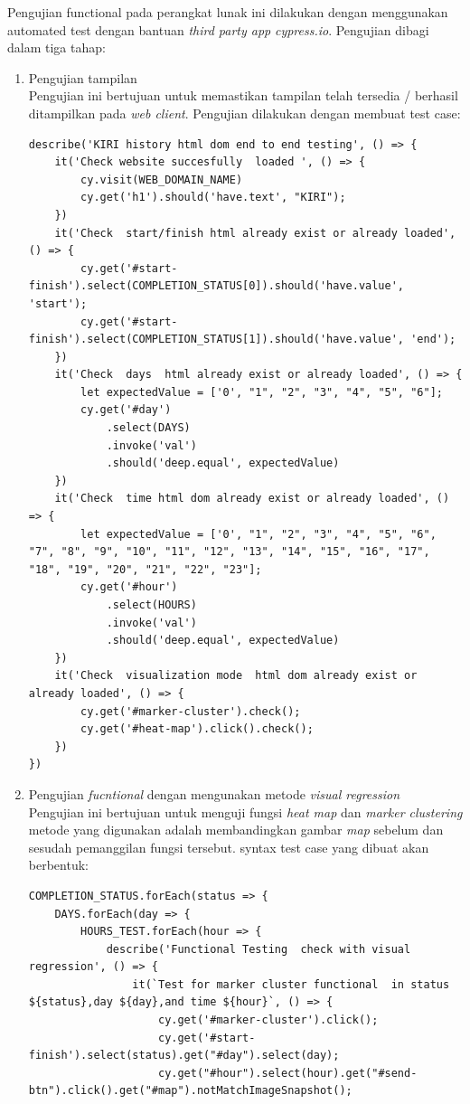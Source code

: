 Pengujian functional pada perangkat lunak ini dilakukan dengan menggunakan automated test dengan bantuan \textit{third party app} \textit{cypress.io}. Pengujian dibagi dalam tiga tahap:

\begin{enumerate}
    \item Pengujian tampilan\\
    Pengujian ini bertujuan untuk memastikan tampilan telah tersedia / berhasil ditampilkan pada \textit{web client}. Pengujian dilakukan dengan membuat test case:\\
    \begin{lstlisting}[label=ui_test_case , caption=UI Test Case]
    describe('KIRI history html dom end to end testing', () => {
    it('Check website succesfully  loaded ', () => {
        cy.visit(WEB_DOMAIN_NAME)
        cy.get('h1').should('have.text', "KIRI");
    })
    it('Check  start/finish html already exist or already loaded', () => {
        cy.get('#start-finish').select(COMPLETION_STATUS[0]).should('have.value', 'start');
        cy.get('#start-finish').select(COMPLETION_STATUS[1]).should('have.value', 'end');
    })
    it('Check  days  html already exist or already loaded', () => {
        let expectedValue = ['0', "1", "2", "3", "4", "5", "6"];
        cy.get('#day')
            .select(DAYS)
            .invoke('val')
            .should('deep.equal', expectedValue)
    })
    it('Check  time html dom already exist or already loaded', () => {
        let expectedValue = ['0', "1", "2", "3", "4", "5", "6", "7", "8", "9", "10", "11", "12", "13", "14", "15", "16", "17", "18", "19", "20", "21", "22", "23"];
        cy.get('#hour')
            .select(HOURS)
            .invoke('val')
            .should('deep.equal', expectedValue)
    })
    it('Check  visualization mode  html dom already exist or already loaded', () => {
        cy.get('#marker-cluster').check();
        cy.get('#heat-map').click().check();
    })
})

    \end{lstlisting}
    
    \newpage\item Pengujian \textit{fucntional} dengan mengunakan metode \textit{visual regression} \\
    Pengujian ini bertujuan untuk menguji fungsi \textit{heat map} dan \textit{marker clustering} metode yang digunakan adalah membandingkan gambar \textit{map} sebelum dan sesudah pemanggilan fungsi tersebut. syntax test case yang dibuat akan berbentuk:\\
    \begin{lstlisting}[label=functional_test_case_visual , caption=Funcional Test Case Visual Regression]
COMPLETION_STATUS.forEach(status => {
    DAYS.forEach(day => {
        HOURS_TEST.forEach(hour => {
            describe('Functional Testing  check with visual regression', () => {
                it(`Test for marker cluster functional  in status ${status},day ${day},and time ${hour}`, () => {
                    cy.get('#marker-cluster').click();
                    cy.get('#start-finish').select(status).get("#day").select(day);
                    cy.get("#hour").select(hour).get("#send-btn").click().get("#map").notMatchImageSnapshot();


\end{lstlisting}
\end{enumerate}
